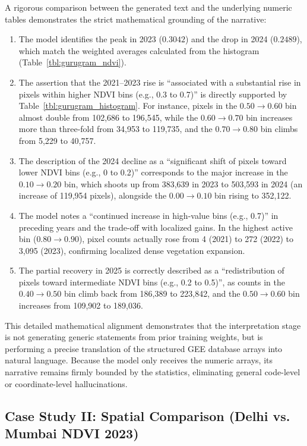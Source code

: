 \documentclass[pdflatex,sn-mathphys-ay]{sn-jnl}
\begin{document}
A rigorous comparison between the generated text and the underlying numeric tables demonstrates the strict mathematical grounding of the narrative:
\begin{enumerate}
    \item The model identifies the peak in 2023 ($0.3042$) and the drop in 2024 ($0.2489$), which match the weighted averages calculated from the histogram (Table~\ref{tbl:gurugram_ndvi}).
    \item The assertion that the 2021--2023 rise is ``associated with a substantial rise in pixels within higher NDVI bins (e.g., 0.3 to 0.7)'' is directly supported by Table~\ref{tbl:gurugram_histogram}. For instance, pixels in the $0.50 \rightarrow 0.60$ bin almost double from 102,686 to 196,545, while the $0.60 \rightarrow 0.70$ bin increases more than three-fold from 34,953 to 119,735, and the $0.70 \rightarrow 0.80$ bin climbs from 5,229 to 40,757.
    \item The description of the 2024 decline as a ``significant shift of pixels toward lower NDVI bins (e.g., 0 to 0.2)'' corresponds to the major increase in the $0.10 \rightarrow 0.20$ bin, which shoots up from 383,639 in 2023 to 503,593 in 2024 (an increase of 119,954 pixels), alongside the $0.00 \rightarrow 0.10$ bin rising to 352,122.
    \item The model notes a ``continued increase in high-value bins (e.g., 0.7)'' in preceding years and the trade-off with localized gains. In the highest active bin ($0.80 \rightarrow 0.90$), pixel counts actually rose from 4 (2021) to 272 (2022) to 3,095 (2023), confirming localized dense vegetation expansion.
    \item The partial recovery in 2025 is correctly described as a ``redistribution of pixels toward intermediate NDVI bins (e.g., 0.2 to 0.5)'', as counts in the $0.40 \rightarrow 0.50$ bin climb back from 186,389 to 223,842, and the $0.50 \rightarrow 0.60$ bin increases from 109,902 to 189,036.
\end{enumerate}

This detailed mathematical alignment demonstrates that the interpretation stage is not generating generic statements from prior training weights, but is performing a precise translation of the structured GEE database arrays into natural language. Because the model only receives the numeric arrays, its narrative remains firmly bounded by the statistics, eliminating general code-level or coordinate-level hallucinations.

\subsection{Case Study II: Spatial Comparison (Delhi vs. Mumbai NDVI 2023)}\label{sec:case_study_ii}
\end{document}
